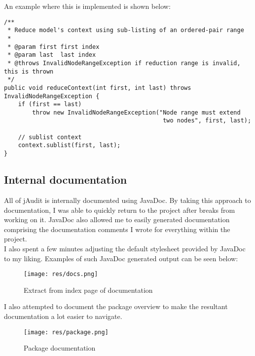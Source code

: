 \documentclass[9pt]{article}
\renewenvironment{framed}[1][\hsize]
   {\MakeFramed{\hsize#1\advance\hsize-\width \FrameRestore}}%
   {\endMakeFramed}
\begin{document}
				An example where this is implemented is shown below:
				
				\begin{framed}[1.2\textwidth]	
					\begin{verbatim}
/**
 * Reduce model's context using sub-listing of an ordered-pair range
 *
 * @param first first index
 * @param last  last index
 * @throws InvalidNodeRangeException if reduction range is invalid, this is thrown
 */
public void reduceContext(int first, int last) throws InvalidNodeRangeException {
	if (first == last)
		throw new InvalidNodeRangeException("Node range must extend
		                                     two nodes", first, last);

	// sublist context
	context.sublist(first, last);
}
					\end{verbatim}
				\end{framed}


		
	\subsection{Internal documentation}

		All of jAudit is internally documented using JavaDoc. By taking this
		approach to documentation, I was able to quickly return to the project
		after breaks from working on it. JavaDoc also allowed me to easily
		generated documentation comprising the documentation comments I wrote
		for everything within the project.\\

		I also spent a few minutes adjusting the default stylesheet provided by
		JavaDoc to my liking. Examples of such JavaDoc generated output can be
		seen below:\\ 

		\begin{figure}[H]
			\centering
			\texttt{[image: res/docs.png]}
			\caption{Extract from index page of documentation}
		\end{figure}

		I also attempted to document the package overview to make the resultant
		documentation a lot easier to navigate.\\

		\begin{figure}[H]
			\centering
			\texttt{[image: res/package.png]}
			\caption{Package documentation}
		\end{figure}
\end{document}
